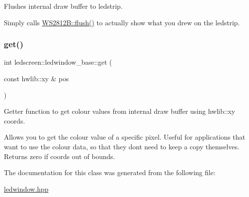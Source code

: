 Flushes internal draw buffer to ledstrip. 

Simply calls \hyperlink{classledscreen_1_1WS2812B_ad30d0950ef865d72ebe2a0b0fe1399e2}{W\+S2812\+B\+::flush()} to actually show what you drew on the ledstrip. \mbox{\label{classledscreen_1_1ledwindow__base_a3d31f2ab0eccbf96c5af2082a39e90c6}} 
\subsubsection{\texorpdfstring{get()}{get()}}
{\footnotesize\ttfamily int ledscreen\+::ledwindow\+\_\+base\+::get (\begin{DoxyParamCaption}\item[{const hwlib\+::xy \&}]{pos }\end{DoxyParamCaption})\hspace{0.3cm}{\ttfamily [inline]}}



Getter function to get colour values from internal draw buffer using hwlib\+::xy coords. 

Allows you to get the colour value of a specific pixel. Useful for applications that want to use the colour data, so that they dont need to keep a copy themselves. Returns zero if coords out of bounds. 

The documentation for this class was generated from the following file\+:\begin{DoxyCompactItemize}
\item 
\hyperlink{ledwindow_8hpp}{ledwindow.\+hpp}\end{DoxyCompactItemize}
